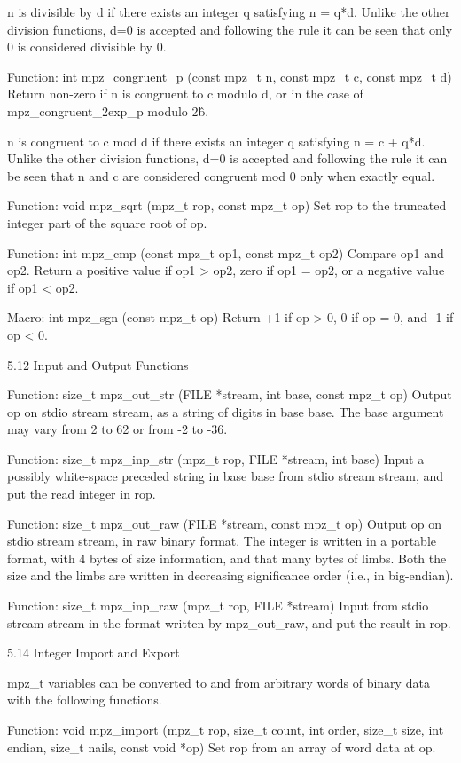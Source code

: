 n is divisible by d if there exists an integer q satisfying n = q*d. Unlike the
other division functions, d=0 is accepted and following the rule it can be seen
that only 0 is considered divisible by 0.

 Function: int mpz\_congruent\_p (const mpz\_t n, const mpz\_t c, const mpz\_t d)
Return non-zero if n is congruent to c modulo d, or in the case of
mpz\_congruent\_2exp\_p modulo 2\^b.

n is congruent to c mod d if there exists an integer q satisfying n = c + q*d.
Unlike the other division functions, d=0 is accepted and following the rule it
can be seen that n and c are considered congruent mod 0 only when exactly equal.

 Function: void mpz\_sqrt (mpz\_t rop, const mpz\_t op)
Set rop to the truncated integer part of the square root of op.

 Function: int mpz\_cmp (const mpz\_t op1, const mpz\_t op2)
Compare op1 and op2. Return a positive value if op1 > op2, zero if op1 = op2, or
a negative value if op1 < op2.

 Macro: int mpz\_sgn (const mpz\_t op)
Return +1 if op > 0, 0 if op = 0, and -1 if op < 0.

5.12 Input and Output Functions

 Function: size\_t mpz\_out\_str (FILE *stream, int base, const mpz\_t op)
Output op on stdio stream stream, as a string of digits in base base. The base
argument may vary from 2 to 62 or from -2 to -36.

 Function: size\_t mpz\_inp\_str (mpz\_t rop, FILE *stream, int base)
Input a possibly white-space preceded string in base base from stdio stream
stream, and put the read integer in rop.

Function: size\_t mpz\_out\_raw (FILE *stream, const mpz\_t op)
Output op on stdio stream stream, in raw binary format. The integer is written
in a portable format, with 4 bytes of size information, and that many bytes of
limbs. Both the size and the limbs are written in decreasing significance order
(i.e., in big-endian).

Function: size\_t mpz\_inp\_raw (mpz\_t rop, FILE *stream)
Input from stdio stream stream in the format written by mpz\_out\_raw, and put
the result in rop.


5.14 Integer Import and Export

mpz\_t variables can be converted to and from arbitrary words of binary data
with the following functions.

 Function: void mpz\_import (mpz\_t rop, size\_t count, int order, size\_t size,
 int endian, size\_t nails, const void *op) Set rop from an array of word data at op.

